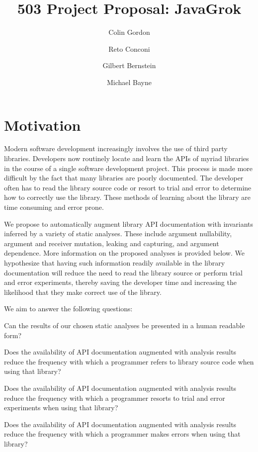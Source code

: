 \documentclass[letterpaper,12pt]{article}
\title{503 Project Proposal: JavaGrok}
\author{Colin Gordon \and Reto Conconi \and Gilbert Bernstein \and Michael Bayne}
\date{}
\let\Itemize =\itemize
\def\Nospacing{\itemsep=0pt\topsep=0pt\partopsep=0pt\parskip=0pt\parsep=0pt}
\renewenvironment{itemize}{\Itemize\Nospacing}{\endlist}
\begin{document}
\maketitle
\small
\section{Motivation}
Modern software development increasingly involves the use of third party
libraries. Developers now routinely locate and learn the APIs of myriad
libraries in the course of a single software development project. This process
is made more difficult by the fact that many libraries are poorly documented.
The developer often has to read the library source code or resort to trial and
error to determine how to correctly use the library. These methods of learning
about the library are time consuming and error prone.

We propose to automatically augment library API documentation with invariants
inferred by a variety of static analyses. These include argument nullability,
argument and receiver mutation, leaking and capturing, and argument
dependence. More information on the proposed analyses is provided below. We
hypothesize that having such information readily available in the library
documentation will reduce the need to read the library source or perform trial
and error experiments, thereby saving the developer time and increasing the
likelihood that they make correct use of the library.

We aim to answer the following questions:
\begin{itemize}
\item Can the results of our chosen static analyses be presented in a human
  readable form?

\item Does the availability of API documentation augmented with analysis
  results reduce the frequency with which a programmer refers to library source
  code when using that library?

\item Does the availability of API documentation augmented with analysis
  results reduce the frequency with which a programmer resorts to trial and
  error experiments when using that library?

\item Does the availability of API documentation augmented with analysis
  results reduce the frequency with which a programmer makes errors when using
  that library?
\end{itemize}
\end{document}
